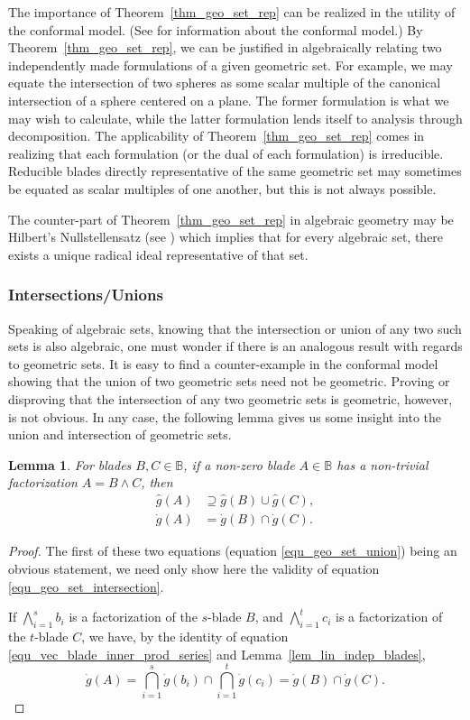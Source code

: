 \documentclass{birkjour}
\newtheorem{lem}[thm]{Lemma}
\theoremstyle{definition}
\theoremstyle{remark}
\numberwithin{equation}{section}
\newcommand{\B}{\mathbb{B}}
\newcommand{\gd}{\dot{g}}
\newcommand{\gh}{\hat{g}}
\begin{document}
The importance of Theorem~\ref{thm_geo_set_rep} can be realized
in the utility of the conformal model.  (See \cite{Dorst07} for information about the conformal model.)
By Theorem~\ref{thm_geo_set_rep}, we can be justified in algebraically
relating two independently made formulations
of a given geometric set.  For example, we may equate the intersection of two spheres as some
scalar multiple of the canonical intersection of a sphere centered on a plane.  The former formulation
is what we may wish to calculate, while the latter formulation lends itself to analysis through decomposition.
The applicability of Theorem~\ref{thm_geo_set_rep} comes in realizing that each formulation (or the
dual of each formulation) is irreducible.
Reducible blades directly representative of the same geometric set may sometimes be equated as scalar multiples
of one another, but this is not always possible.

The counter-part of Theorem~\ref{thm_geo_set_rep} in algebraic geometry may be Hilbert's Nullstellensatz (see \cite[p.~206]{Garrity13})
which implies that for every algebraic set, there exists a unique radical ideal representative of that set.

\subsubsection{Intersections/Unions}

Speaking of algebraic sets, knowing that the intersection or union of any two such sets is also algebraic,
one must wonder if there is an analogous result with regards to geometric sets.  It is easy to find a counter-example
in the conformal model showing that the union of two geometric sets need not be geometric.
Proving or disproving that the intersection of any two geometric sets is geometric, however, is not obvious.
In any case, the following lemma gives us some insight into the union and intersection of geometric sets.

\begin{lem}\label{lem_union_intersect}
For blades $B,C\in\B$, if a non-zero blade $A\in\B$ has a non-trivial factorization $A=B\wedge C$, then
\begin{align}
\gh(A) &\supseteq \gh(B)\cup\gh(C),\label{equ_geo_set_union} \\
\gd(A) &= \gd(B)\cap\gd(C).\label{equ_geo_set_intersection}
\end{align}
\end{lem}
\begin{proof}
The first of these two equations (equation \eqref{equ_geo_set_union}) being an obvious statement,
we need only show here the validity of equation \eqref{equ_geo_set_intersection}.

If $\bigwedge_{i=1}^s b_i$ is a factorization of the $s$-blade $B$, and
$\bigwedge_{i=1}^t c_i$ is a factorization of the $t$-blade $C$, we have,
by the identity of equation \eqref{equ_vec_blade_inner_prod_series} and Lemma~\ref{lem_lin_indep_blades},
\begin{equation}
\gd(A) = \bigcap_{i=1}^s\gd(b_i)\cap\bigcap_{i=1}^t\gd(c_i) = \gd(B)\cap\gd(C).
\end{equation}
\end{proof}
\end{document}
